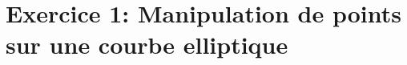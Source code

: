 \documentclass[fleqn, french,a4paper,11pt]{exam}
\newcommand{\Zp}[1]{\mathbb{Z}/{#1}\mathbb{Z}}
\begin{document}
		

		
		
		

	


	\section*{Exercice 1: Manipulation de points sur une courbe elliptique}
	
\end{document}
